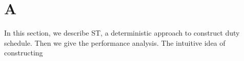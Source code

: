 \section{A}

In this section, we describe ST, a deterministic approach to construct duty schedule. Then we give the performance  analysis.
The intuitive idea of constructing